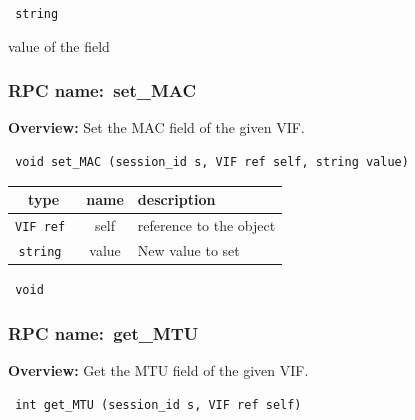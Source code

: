 \vspace{0.3cm}

{\tt 
string
}


value of the field
\vspace{0.3cm}
\vspace{0.3cm}
\vspace{0.3cm}
\subsubsection{RPC name:~set\_MAC}

{\bf Overview:} 
Set the MAC field of the given VIF.

\begin{verbatim} void set_MAC (session_id s, VIF ref self, string value)\end{verbatim}



 
\vspace{0.3cm}
\begin{tabular}{|c|c|p{7cm}|}
 \hline
{\bf type} & {\bf name} & {\bf description} \\ \hline
{\tt VIF ref } & self & reference to the object \\ \hline 

{\tt string } & value & New value to set \\ \hline 

\end{tabular}

\vspace{0.3cm}

{\tt 
void
}



\vspace{0.3cm}
\vspace{0.3cm}
\vspace{0.3cm}
\subsubsection{RPC name:~get\_MTU}

{\bf Overview:} 
Get the MTU field of the given VIF.

\begin{verbatim} int get_MTU (session_id s, VIF ref self)\end{verbatim}



